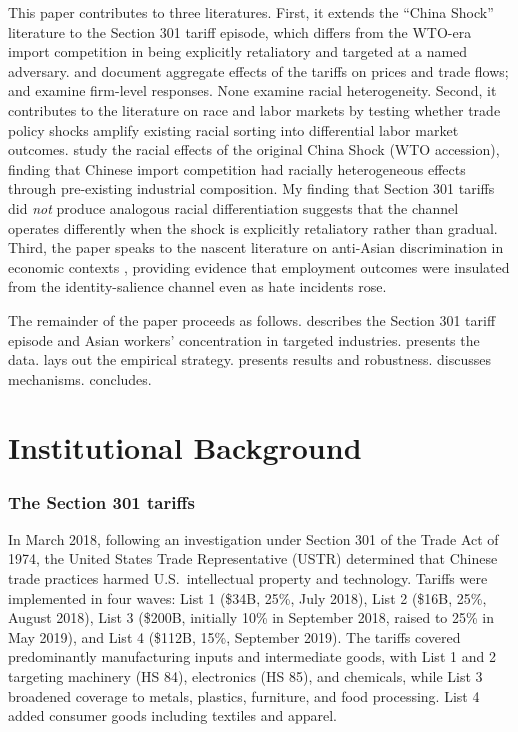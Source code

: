 \documentclass[12pt]{article}
\begin{document}
This paper contributes to three literatures. First, it extends the ``China Shock'' literature \citep{autor2013china,autor2016china,pierce2016surprisingly} to the Section 301 tariff episode, which differs from the WTO-era import competition in being explicitly retaliatory and targeted at a named adversary. \citet{fajgelbaum2020return} and \citet{amiti2019impact} document aggregate effects of the tariffs on prices and trade flows; \citet{flaaen2020production} and \citet{handley2020rising} examine firm-level responses. None examine racial heterogeneity. Second, it contributes to the literature on race and labor markets \citep{bertrand2004emily,lang2020racial} by testing whether trade policy shocks amplify existing racial sorting into differential labor market outcomes. \citet{autor2022racial} study the racial effects of the original China Shock (WTO accession), finding that Chinese import competition had racially heterogeneous effects through pre-existing industrial composition. My finding that Section 301 tariffs did \textit{not} produce analogous racial differentiation suggests that the channel operates differently when the shock is explicitly retaliatory rather than gradual. Third, the paper speaks to the nascent literature on anti-Asian discrimination in economic contexts \citep{gee2021anti,tang2022discrimination}, providing evidence that employment outcomes were insulated from the identity-salience channel even as hate incidents rose.

The remainder of the paper proceeds as follows.  describes the Section 301 tariff episode and Asian workers' concentration in targeted industries.  presents the data.  lays out the empirical strategy.  presents results and robustness.  discusses mechanisms.  concludes.


\section{Institutional Background}\label{sec:background}

\subsubsection*{The Section 301 tariffs} In March 2018, following an investigation under Section 301 of the Trade Act of 1974, the United States Trade Representative (USTR) determined that Chinese trade practices harmed U.S.\ intellectual property and technology. Tariffs were implemented in four waves: List 1 (\$34B, 25\%, July 2018), List 2 (\$16B, 25\%, August 2018), List 3 (\$200B, initially 10\% in September 2018, raised to 25\% in May 2019), and List 4 (\$112B, 15\%, September 2019). The tariffs covered predominantly manufacturing inputs and intermediate goods, with List 1 and 2 targeting machinery (HS 84), electronics (HS 85), and chemicals, while List 3 broadened coverage to metals, plastics, furniture, and food processing. List 4 added consumer goods including textiles and apparel.
\end{document}
